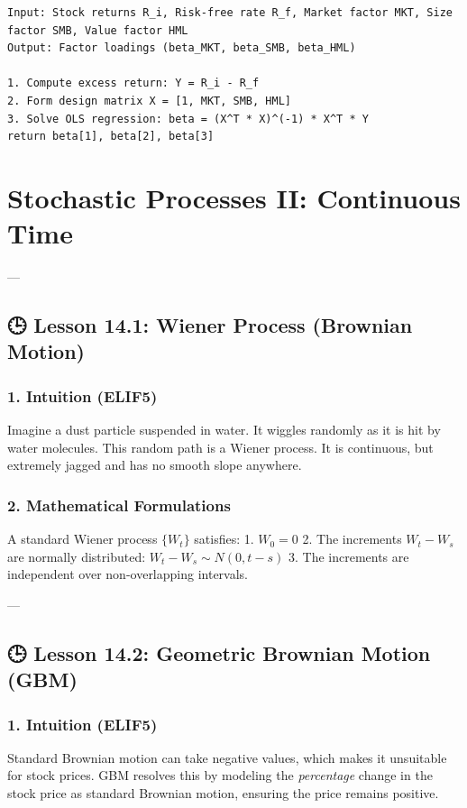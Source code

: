 \documentclass[11pt,oneside]{book}
\begin{document}
\begin{tcolorbox}[colback=white,colframe=black,boxrule=0.6pt,arc=0mm,title=Fama-French Regression]
\begin{verbatim}
Input: Stock returns R_i, Risk-free rate R_f, Market factor MKT, Size factor SMB, Value factor HML
Output: Factor loadings (beta_MKT, beta_SMB, beta_HML)

1. Compute excess return: Y = R_i - R_f
2. Form design matrix X = [1, MKT, SMB, HML]
3. Solve OLS regression: beta = (X^T * X)^(-1) * X^T * Y
return beta[1], beta[2], beta[3]
\end{verbatim}
\end{tcolorbox}


\newpage

\chapter{Stochastic Processes II: Continuous Time}

---

\section{🕒 Lesson 14.1: Wiener Process (Brownian Motion)}

\subsection{1. Intuition (ELIF5)}
Imagine a dust particle suspended in water. It wiggles randomly as it is hit by water molecules. This random path is a Wiener process. It is continuous, but extremely jagged and has no smooth slope anywhere.

\subsection{2. Mathematical Formulations}
A standard Wiener process $\{W_t\}$ satisfies:
1. $W_0 = 0$
2. The increments $W_t - W_s$ are normally distributed: $W_t - W_s \sim N(0, t-s)$
3. The increments are independent over non-overlapping intervals.

---

\section{🕒 Lesson 14.2: Geometric Brownian Motion (GBM)}

\subsection{1. Intuition (ELIF5)}
Standard Brownian motion can take negative values, which makes it unsuitable for stock prices. GBM resolves this by modeling the \textit{percentage} change in the stock price as standard Brownian motion, ensuring the price remains positive.
\end{document}
